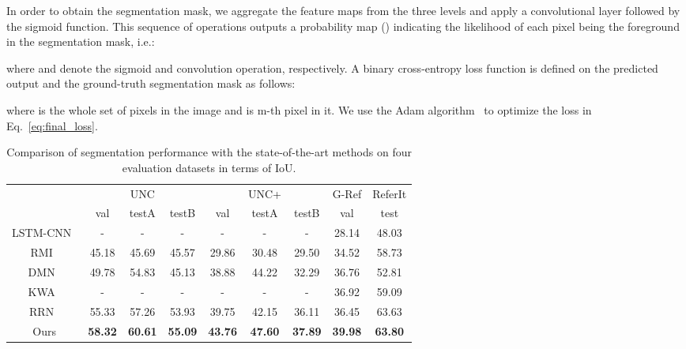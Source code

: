 \documentclass[10pt,twocolumn,letterpaper]{article}
\begin{document}
In order to obtain the segmentation mask, we aggregate the feature maps  from the three levels and apply a  convolutional layer followed by the sigmoid function. This sequence of operations outputs a probability map () indicating the likelihood of each pixel being the foreground in the segmentation mask, i.e.:

where  and  denote the sigmoid and  convolution operation, respectively. A binary cross-entropy loss function is defined on the predicted output and the ground-truth segmentation mask  as follows:

where  is the whole set of pixels in the image and  is m-th pixel in it. We use the Adam algorithm~\cite{kingma2014adam} to optimize the loss in Eq.~\ref{eq:final_loss}.





  \begin{table*}[ht!]
\begin{center}
\begin{tabular}{|c|ccc|ccc|c|c|}
\hline
	 &  &UNC& & &UNC+& & G-Ref  & ReferIt\\

	    & val &  testA &  testB &  val &  testA &  testB & val  & test\\
\hline
LSTM-CNN~\cite{hu2016segmentation} & - &  - &  -  		    &   - &  - &  -  			& 28.14 & 48.03 \\
RMI~\cite{liu2017recurrent} & 45.18 &  45.69 &  45.57 & 29.86 &  30.48 &  29.50  & 34.52 & 58.73 \\
DMN~\cite{margffoy2018dynamic}  & 49.78 &  54.83 &  45.13 & 38.88 &  44.22 &  32.29  & 36.76 & 52.81 \\
KWA~\cite{shi2018key}  & - &  - &  -  & - &  - &  -  & 36.92 & 59.09 \\
RRN~\cite{li2018referring}      & 55.33 &  57.26 &  53.93 & 39.75 &  42.15 &  36.11  & 36.45 & 63.63 \\
Ours		& \textbf{58.32} &  \textbf{60.61} &  \textbf{55.09}      &   \textbf{43.76} &  \textbf{47.60} &  \textbf{37.89}         & \textbf{39.98} & \textbf{63.80}  \\
\hline
\end{tabular}
\end{center}
\caption{Comparison of segmentation performance with the state-of-the-art methods on four evaluation datasets in terms of IoU.}
\label{tab:miou}
\end{table*}
\end{document}
